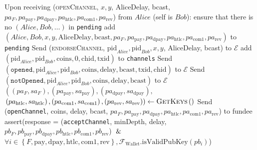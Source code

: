 \begin{algorithmic}[1]
    \State Upon receiving (\textsc{openChannel}, $x, y$, AliceDelay, bcast,
    $pa_F, pa_{\mathrm{pay}}, pa_{\mathrm{dpay}}, pa_{\mathrm{htlc}},
    pa_{\mathrm{com}1}, pa_{\mathrm{rev}}$) from $Alice$ (self is $Bob$):
    \Indent
      \State ensure that there is no $\left(Alice, Bob, \dots\right)$ in
      \texttt{pending}
      \State add $\left(Alice, Bob, x, y, \mathrm{AliceDelay}, \mathrm{bcast},
      pa_F, pa_{\mathrm{pay}}, pa_{\mathrm{dpay}}, pa_{\mathrm{htlc}},
      pa_{\mathrm{com}1}, pa_{\mathrm{rev}}\right)$ to \texttt{pending}
      \State Send (\textsc{endorseChannel}, $\mathrm{pid}_{Alice},
      \mathrm{pid}_{Bob}, x, y$, AliceDelay, bcast) to $\mathcal{E}$
        \State add $\left(\mathrm{pid}_{Alice}, \mathrm{pid}_{Bob},
        \mathrm{coins}, 0, \mathrm{chid}, \mathrm{txid}\right)$ to
        \texttt{channels}
        \State Send $\left(\mathtt{opened}, \mathrm{pid}_{Alice},
        \mathrm{pid}_{Bob}, \mathrm{coins}, \mathrm{delay}, \mathrm{bcast},
        \mathrm{txid}, \mathrm{chid}\right)$
        \Indent
          \Indent
            \State to $\mathcal{E}$
          \EndIndent
        \EndIndent
      \Else
        \State Send $\left(\mathtt{notOpened}, \mathrm{pid}_{Alice},
        \mathrm{pid}_{Bob}, \mathrm{coins}, \mathrm{delay},
        \mathrm{bcast}\right)$ to $\mathcal{E}$
      \EndIf
    \EndIndent
    \State
      \State $\left(\left(pa_F, sa_F\right), \left(pa_{\mathrm{pay}},
      sa_{\mathrm{pay}}\right), \left(pa_{\mathrm{dpay}},
      sa_{\mathrm{dpay}}\right),\right.$
      \Indent
        \State $\left.\left(pa_{\mathrm{htlc}}, sa_{\mathrm{htlc}}\right),
        \left(pa_{\mathrm{com}1}, sa_{\mathrm{com}1}\right),
        \left(pa_{\mathrm{rev}}, sa_{\mathrm{rev}}\right)\right) \gets
        \textsc{GetKeys}\left(\right)$
      \EndIndent
      \State Send (\texttt{openChannel}, coins, delay, bcast,
      \Indent
        \State $pa_F, pa_{\mathrm{pay}}, pa_{\mathrm{dpay}}, pa_{\mathrm{htlc}},
        pa_{\mathrm{com}1}, pa_{\mathrm{rev}}$) to fundee
      \EndIndent
      \State assert(response = (\texttt{acceptChannel}, minDepth, delay,
      \Indent
        \State $pb_F, pb_{\mathrm{pay}}, pb_{\mathrm{dpay}}, pb_{\mathrm{htlc}},
        pb_{\mathrm{com}1}, pb_{\mathrm{rev}}$) $\And$
        \State $\forall i \in \left\{F, \mathrm{pay}, \mathrm{dpay},
        \mathrm{htlc}, \mathrm{com}1, \mathrm{rev}\right\},
        \mathcal{F}_{\mathrm{Wallet}}.\mathrm{isValidPubKey}\left(pb_i\right)$)

\end{algorithmic}

